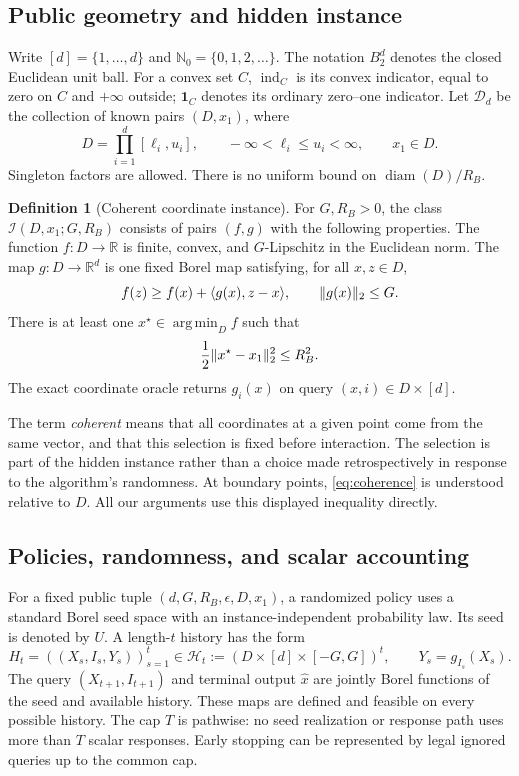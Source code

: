 \documentclass[11pt]{article}
\numberwithin{equation}{section}
\theoremstyle{definition}
\newtheorem{definition}[definition]{Definition}
\theoremstyle{remark}
\newcommand{\R}{\mathbb R}
\newcommand{\N}{\mathbb N}
\newcommand{\one}{\mathbf 1}
\newcommand{\cI}{\mathcal I}
\newcommand{\cD}{\mathcal D}
\newcommand{\cH}{\mathcal H}
\newcommand{\eps}{\epsilon}
\DeclareMathOperator{\argmin}{arg\,min}
\DeclareMathOperator{\diam}{diam}
\DeclareMathOperator{\ind}{ind}
\DeclarePairedDelimiter{\norm}{\lVert}{\rVert}
\newcommand{\ip}[2]{\langle #1,#2\rangle}
\begin{document}
\subsection{Public geometry and hidden instance}

Write $[d]=\{1,\ldots,d\}$ and $\N_0=\{0,1,2,\ldots\}$. The notation $B_2^d$ denotes the closed Euclidean unit ball. For a convex set $C$, $\ind_C$ is its convex indicator, equal to zero on $C$ and $+\infty$ outside; $\one_C$ denotes its ordinary zero--one indicator. Let $\cD_d$ be the collection of known pairs $(D,x_1)$, where
\begin{equation}\label{eq:box-domain}
D=\prod_{i=1}^d[\ell_i,u_i],\qquad
-\infty<\ell_i\le u_i<\infty,\qquad x_1\in D.
\end{equation}
Singleton factors are allowed. There is no uniform bound on $\diam(D)/R_B$.

\begin{definition}[Coherent coordinate instance]\label{def:instance}
For $G,R_B>0$, the class $\cI(D,x_1;G,R_B)$ consists of pairs $(f,g)$ with the following properties. The function $f:D\to\R$ is finite, convex, and $G$-Lipschitz in the Euclidean norm. The map $g:D\to\R^d$ is one fixed Borel map satisfying, for all $x,z\in D$,
\begin{equation}\label{eq:coherence}
f(z)\ge f(x)+\ip{g(x)}{z-x},\qquad \norm{g(x)}_2\le G.
\end{equation}
There is at least one $x^\star\in\argmin_D f$ such that
\begin{equation}\label{eq:radius}
\frac12\norm{x^\star-x_1}_2^2\le R_B^2.
\end{equation}
The exact coordinate oracle returns $g_i(x)$ on query $(x,i)\in D\times[d]$.
\end{definition}

The term \emph{coherent} means that all coordinates at a given point come from the same vector, and that this selection is fixed before interaction. The selection is part of the hidden instance rather than a choice made retrospectively in response to the algorithm's randomness. At boundary points, \eqref{eq:coherence} is understood relative to $D$. All our arguments use this displayed inequality directly.

\subsection{Policies, randomness, and scalar accounting}

For a fixed public tuple $(d,G,R_B,\eps,D,x_1)$, a randomized policy uses a standard Borel seed space with an instance-independent probability law. Its seed is denoted by $U$. A length-$t$ history has the form
\[
H_t=((X_s,I_s,Y_s))_{s=1}^t\in
\cH_t:=(D\times[d]\times[-G,G])^t,
\qquad Y_s=g_{I_s}(X_s).
\]
The query $(X_{t+1},I_{t+1})$ and terminal output $\widehat x$ are jointly Borel functions of the seed and available history. These maps are defined and feasible on every possible history. The cap $T$ is pathwise: no seed realization or response path uses more than $T$ scalar responses. Early stopping can be represented by legal ignored queries up to the common cap.
\end{document}
